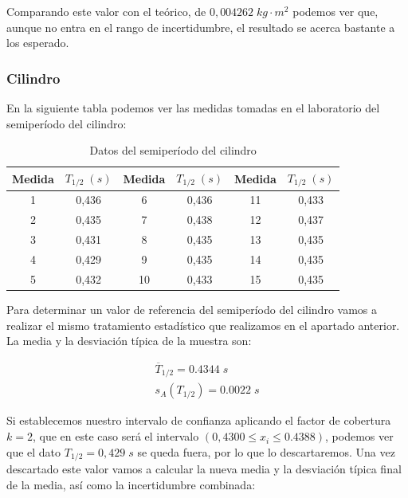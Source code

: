 \documentclass[a4paper,12pt,titlepage]{article}
\begin{document}
Comparando este valor con el teórico, de $0,004262 \; kg \cdot m^2$ podemos ver que, aunque no entra en el rango de incertidumbre, el resultado se acerca bastante a los esperado.

\subsubsection{Cilindro}

En la siguiente tabla podemos ver las medidas tomadas en el laboratorio del semiperíodo del cilindro:

\begin{table}[h!]
    \centering
    \begin{tabular}{|c|c|c|c|c|c|}
    \hline
    Medida  &  $T_{1/2} \; (s)$ & Medida   &   $T_{1/2} \; (s)$    & Medida   &   $T_{1/2} \; (s)$    \\ \hline
    1 & 0,436 & 6  & 0,436 & 11 & 0,433 \\ \hline
    2 & 0,435 & 7  & 0,438 & 12 & 0,437 \\ \hline
    3 & 0,431 & 8  & 0,435 & 13 & 0,435 \\ \hline
    4 & 0,429 & 9  & 0,435 & 14 & 0,435 \\ \hline
    5 & 0,432 & 10 & 0,433 & 15 & 0,435 \\ \hline
    \end{tabular}
    \caption{Datos del semiperíodo del cilindro}
    \label{Datos semiT cilindro}
\end{table}

Para determinar un valor de referencia del semiperíodo del cilindro vamos a realizar el mismo tratamiento estadístico que realizamos en el apartado anterior. La media y la desviación típica de la muestra son:

\begin{equation}
    \begin{gathered}
        \overline{T}_{1/2} = 0.4344 \; s\\
        s_A(T_{1/2}) = 0.0022 \; s
    \end{gathered}
\end{equation}

Si establecemos nuestro intervalo de confianza aplicando el factor de cobertura $k=2$, que en este caso será el intervalo $(0,4300 \leq x_i \leq 0.4388)$, podemos ver que el dato $T_{1/2}=0,429 \; s$ se queda fuera, por lo que lo descartaremos. Una vez descartado este valor vamos a calcular la nueva media y la desviación típica final de la media, así como la incertidumbre combinada:
\end{document}
